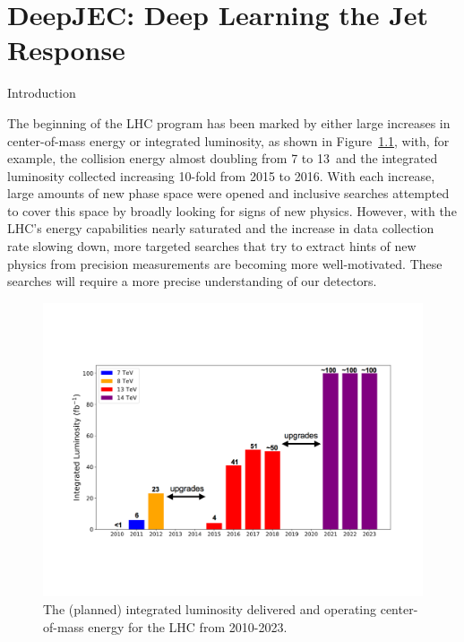 \chapter{DeepJEC: Deep Learning the Jet Response}

\begin{section}{Introduction}

The beginning of the LHC program has been marked by either large increases in center-of-mass energy or integrated luminosity, as shown in Figure~\ref{fig:lhc_plan}, with, for example, the collision energy almost doubling from 7 to 13~\TeV and the integrated luminosity collected increasing 10-fold from 2015 to 2016.
With each increase, large amounts of new phase space were opened and inclusive searches attempted to cover this space by broadly looking for signs of new physics.
However, with the LHC's energy capabilities nearly saturated and the increase in data collection rate slowing down, more targeted searches that try to extract hints of new physics from precision measurements are becoming more well-motivated.
These searches will require a more precise understanding of our detectors.

\begin{figure}[tbp!]
\begin{center}
\includegraphics[angle=0,width=0.90\columnwidth]{fig/lhc_plan.pdf}
\end{center}
\caption{The (planned) integrated luminosity delivered and operating center-of-mass energy for the LHC from 2010-2023.}
\label{fig:lhc_plan}
\end{figure}


\end{section}
